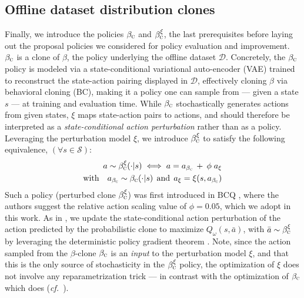 \subsection{Offline dataset distribution clones}
\label{offlineclones}
Finally, we introduce the policies $\beta_\textsc{c}$ and $\beta_\textsc{c}^\xi$, the last prerequisites
before laying out the proposal policies we considered for policy evaluation and improvement.
$\beta_\textsc{c}$ is a clone of $\beta$, the policy underlying
the offline dataset $\mathcal{D}$. Concretely, the $\beta_\textsc{c}$ policy
is modeled via a state-conditional variational auto-encoder (VAE) \cite{Kingma2014-hf, Rezende2014-ef}
trained to reconstruct the state-action pairing displayed in $\mathcal{D}$,
effectively cloning $\beta$ via behavioral cloning (BC),
making it a policy one can sample from --- given a state $s$ --- at training and evaluation time.
While $\beta_\textsc{c}$ stochastically generates actions from given states,
$\xi$ maps state-action pairs to actions,
and should therefore be interpreted as a \textit{state-conditional action perturbation} rather than as
a policy. Leveraging the perturbation model $\xi$,
we introduce $\beta_\textsc{c}^\xi$ to satisfy the following equivalence, $(\forall s \in \mathcal{S})$:
\begin{align}
  a \sim \beta_\textsc{c}^\xi(\cdot | s)
  \iff
  a = a_{\beta_\textsc{c}} \: + \: \phi \; a_\xi \\
  \text{with} \quad
  a_{\beta_\textsc{c}} \sim \beta_\textsc{c}(\cdot | s)
  \;\, \text{and} \;\,
  a_\xi = \xi(s, a_{\beta_\textsc{c}})
  \label{xieq}
\end{align}
Such a policy (perturbed clone $\beta_\textsc{c}^\xi$) was first introduced in BCQ \cite{Fujimoto2018-mj},
where the authors suggest the relative action scaling value of $\phi = 0.05$, which we adopt in this work.
As in \cite{Fujimoto2018-mj},
we update the state-conditional action perturbation of the action predicted by the probabilistic clone
to maximize $Q_\omega(s, \bar{a})$, with $\bar{a} \sim \beta_\textsc{c}^\xi$
by leveraging the deterministic policy gradient theorem \cite{Silver2014-dk}.
Note, since the action sampled from the $\beta$-clone $\beta_\textsc{c}$
is an \textit{input} to the perturbation model $\xi$,
and that this is the only source of stochasticity in the $\beta_\textsc{c}^\xi$ policy,
the optimization of $\xi$ does not involve any reparametrization trick
--- in contrast with the optimization of $\beta_\textsc{c}$ which does
(\textit{cf.}~\cite{Kingma2014-hf, Rezende2014-ef}).

